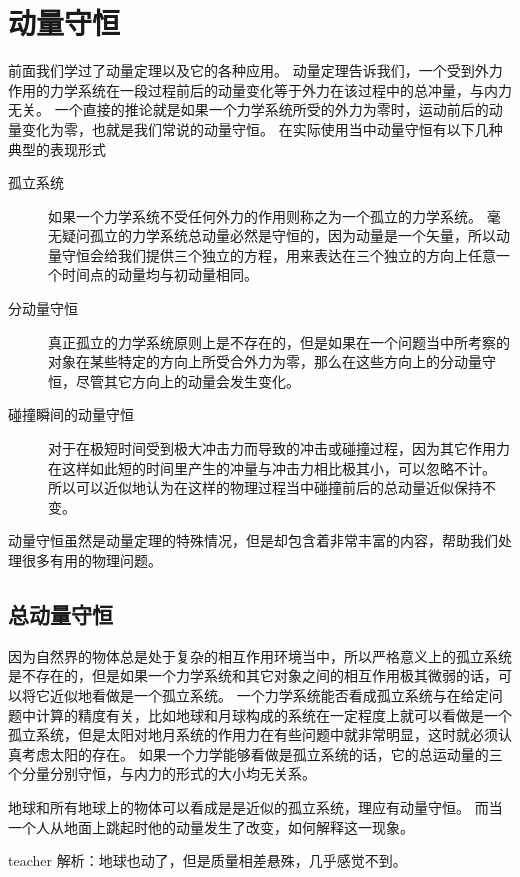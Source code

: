 \section{动量守恒}
前面我们学过了动量定理以及它的各种应用。
动量定理告诉我们，一个受到外力作用的力学系统在一段过程前后的动量变化等于外力在该过程中的总冲量，与内力无关。
一个直接的推论就是如果一个力学系统所受的外力为零时，运动前后的动量变化为零，也就是我们常说的动量守恒。
在实际使用当中动量守恒有以下几种典型的表现形式
\begin{description}
\item[孤立系统]
如果一个力学系统不受任何外力的作用则称之为一个孤立的力学系统。
毫无疑问孤立的力学系统总动量必然是守恒的，因为动量是一个矢量，所以动量守恒会给我们提供三个独立的方程，用来表达在三个独立的方向上任意一个时间点的动量均与初动量相同。
\item[分动量守恒]
真正孤立的力学系统原则上是不存在的，但是如果在一个问题当中所考察的对象在某些特定的方向上所受合外力为零，那么在这些方向上的分动量守恒，尽管其它方向上的动量会发生变化。
\item[碰撞瞬间的动量守恒]
对于在极短时间受到极大冲击力而导致的冲击或碰撞过程，因为其它作用力在这样如此短的时间里产生的冲量与冲击力相比极其小，可以忽略不计。
所以可以近似地认为在这样的物理过程当中碰撞前后的总动量近似保持不变。
\end{description}

动量守恒虽然是动量定理的特殊情况，但是却包含着非常丰富的内容，帮助我们处理很多有用的物理问题。



\subsection{总动量守恒}
因为自然界的物体总是处于复杂的相互作用环境当中，所以严格意义上的孤立系统是不存在的，但是如果一个力学系统和其它对象之间的相互作用极其微弱的话，可以将它近似地看做是一个孤立系统。
一个力学系统能否看成孤立系统与在给定问题中计算的精度有关，比如地球和月球构成的系统在一定程度上就可以看做是一个孤立系统，但是太阳对地月系统的作用力在有些问题中就非常明显，这时就必须认真考虑太阳的存在。
如果一个力学能够看做是孤立系统的话，它的总运动量的三个分量分别守恒，与内力的形式的大小均无关系。


\begin{example}

地球和所有地球上的物体可以看成是是近似的孤立系统，理应有动量守恒。
而当一个人从地面上跳起时他的动量发生了改变，如何解释这一现象。
\begin{taggedblock}{teacher}
\newline
解析：地球也动了，但是质量相差悬殊，几乎感觉不到。
\end{taggedblock}
\end{example}



